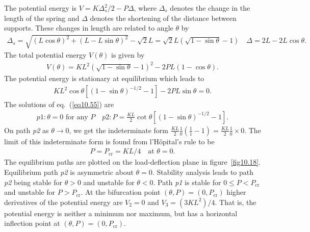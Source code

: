 \documentclass{AeroStructure-ERJohnson}
\begin{document}
\noindent The potential energy is $V=K \Delta_{s}^{2} / 2-P \Delta$, where $\Delta_{s}$ denotes the change in the length of the spring and $\Delta$ denotes the shortening of the distance between supports. These changes in length are related to angle $\theta$ by
\begin{align}\label{eq10.53}
\Delta_{s}=\sqrt{(L \cos \theta)^{2}+(L-L \sin \theta)^{2}}-\sqrt{2} L=\sqrt{2} L(\sqrt{1-\sin \theta}-1) \quad \Delta=2 L-2 L \cos \theta.
\end{align}
The total potential energy $V(\theta)$ is given by
\begin{align}\label{eq10.54}
V(\theta)=K L^{2}(\sqrt{1-\sin \theta}-1)^{2}-2 P L(1-\cos \theta).
\end{align}
The potential energy is stationary at equilibrium which leads to
\begin{align}\label{eq10.55}
K L^{2} \cos \theta[(1-\sin \theta)^{-1 / 2}-1]-2 P L \sin \theta=0.
\end{align}
The solutions of eq.~(\ref{eq10.55}) are
\begin{align}\label{eq10.56}
p 1: \theta=0 \text { for any } P \quad p 2: P=\frac{K L}{2} \cot \theta[(1-\sin \theta)^{-1 / 2}-1].
\end{align}
On path \textit{p2} as $\theta \rightarrow 0$, we get the indeterminate form $\frac{K L}{2} \frac{1}{0}\left(\frac{1}{1}-1\right)=\frac{K L}{2} \frac{1}{0} \times 0$. The limit of this indeterminate form is found from l'H\^{o}pital's rule to be
\begin{align}\label{eq10.57}
P=P_{\mathrm{cr}}=K L / 4\quad \text {at } \theta=0.
\end{align}
The equilibrium paths are plotted on the load-deflection plane in figure~\ref{fig10.18}. Equilibrium path \textit{p2} is asymmetric about $\theta = 0$. Stability analysis leads to path \textit{p2} being stable for $\theta > 0$ and unstable for $\theta < 0$. Path \textit{p1} is stable for $0 \leq P<P_{\mathrm{cr}}$ and unstable for $P>P_{\mathrm{cr}}$. At the bifurcation point $(\theta, P)=\left(0, P_{\mathrm{cr}}\right)$ higher derivatives of the potential energy are $V_{2}=0$ and $V_{3}=\left(3 K L^{2}\right) / 4$. That is, the potential energy is neither a minimum nor maximum, but has a horizontal inflection point at $(\theta, P)=\left(0, P_{\mathrm{cr}}\right)$.

{\def\thefigure{10.18}
}
\end{document}
